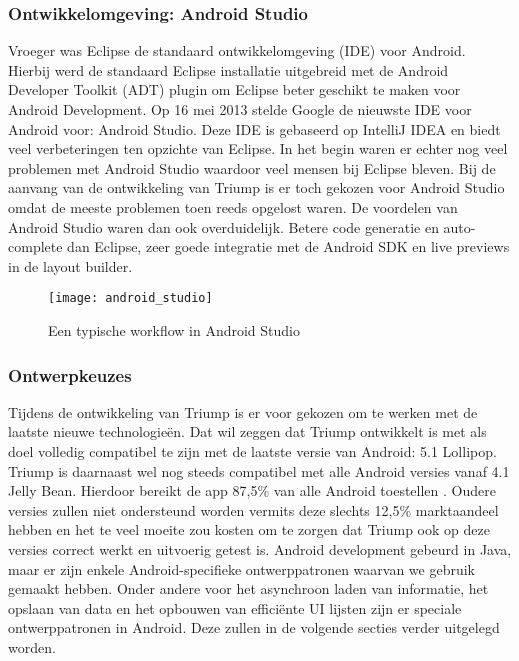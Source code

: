 \subsubsection{Ontwikkelomgeving: Android Studio}
Vroeger was Eclipse de standaard ontwikkelomgeving (IDE) voor Android. Hierbij werd de standaard Eclipse installatie uitgebreid met de Android Developer Toolkit (ADT) plugin om Eclipse beter geschikt te maken voor Android Development. Op 16 mei 2013 stelde Google de nieuwste IDE voor Android voor: Android Studio. Deze IDE is gebaseerd op IntelliJ IDEA en biedt veel verbeteringen ten opzichte van Eclipse. In het begin waren er echter nog veel problemen met Android Studio waardoor veel mensen bij Eclipse bleven. Bij de aanvang van de ontwikkeling van Triump is er toch gekozen voor Android Studio omdat de meeste problemen toen reeds opgelost waren.
De voordelen van Android Studio waren dan ook overduidelijk. Betere code generatie en auto-complete dan Eclipse, zeer goede integratie met de Android SDK en live previews in de layout builder. 

\begin{figure}[H]
	\centering
	\texttt{[image: android\_studio]}
	\caption{Een typische workflow in Android Studio}
	\label{fig:Android Studio Workflow}
\end{figure}

\subsubsection{Ontwerpkeuzes}
Tijdens de ontwikkeling van Triump is er voor gekozen om te werken met de laatste nieuwe technologieën. Dat wil zeggen dat Triump ontwikkelt is met als doel volledig compatibel te zijn met de laatste versie van Android: 5.1 Lollipop. Triump is daarnaast wel nog steeds compatibel met alle Android versies vanaf 4.1 Jelly Bean. Hierdoor bereikt de app 87,5\% van alle Android toestellen \cite{market_share}. Oudere versies zullen niet ondersteund worden vermits deze slechts 12,5\% marktaandeel hebben en het te veel moeite zou kosten om te zorgen dat Triump ook op deze versies correct werkt en uitvoerig getest is.
Android development gebeurd in Java, maar er zijn enkele Android-specifieke ontwerppatronen waarvan we gebruik gemaakt hebben. Onder andere voor het asynchroon laden van informatie, het opslaan van data en het opbouwen van efficiënte UI lijsten zijn er speciale ontwerppatronen in Android. Deze zullen in de volgende secties verder uitgelegd worden.

